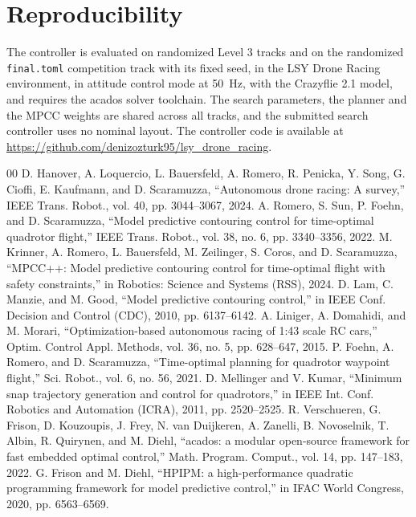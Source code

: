 \documentclass[conference]{IEEEtran}
\begin{document}
\appendices
\section{Reproducibility}
The controller is evaluated on randomized Level 3 tracks and on the randomized \texttt{final.toml} competition track with its fixed seed, in the LSY Drone Racing environment, in attitude control mode at 50~Hz, with the Crazyflie 2.1 model, and requires the acados solver toolchain. The search parameters, the planner and the MPCC weights are shared across all tracks, and the submitted search controller uses no nominal layout. The controller code is available at \url{https://github.com/denizozturk95/lsy_drone_racing}.

\begin{thebibliography}{00}
 D. Hanover, A. Loquercio, L. Bauersfeld, A. Romero, R. Penicka, Y. Song, G. Cioffi, E. Kaufmann, and D. Scaramuzza, ``Autonomous drone racing: A survey,'' IEEE Trans. Robot., vol. 40, pp. 3044--3067, 2024.
 A. Romero, S. Sun, P. Foehn, and D. Scaramuzza, ``Model predictive contouring control for time-optimal quadrotor flight,'' IEEE Trans. Robot., vol. 38, no. 6, pp. 3340--3356, 2022.
 M. Krinner, A. Romero, L. Bauersfeld, M. Zeilinger, S. Coros, and D. Scaramuzza, ``MPCC++: Model predictive contouring control for time-optimal flight with safety constraints,'' in Robotics: Science and Systems (RSS), 2024.
 D. Lam, C. Manzie, and M. Good, ``Model predictive contouring control,'' in IEEE Conf. Decision and Control (CDC), 2010, pp. 6137--6142.
 A. Liniger, A. Domahidi, and M. Morari, ``Optimization-based autonomous racing of 1:43 scale RC cars,'' Optim. Control Appl. Methods, vol. 36, no. 5, pp. 628--647, 2015.
 P. Foehn, A. Romero, and D. Scaramuzza, ``Time-optimal planning for quadrotor waypoint flight,'' Sci. Robot., vol. 6, no. 56, 2021.
 D. Mellinger and V. Kumar, ``Minimum snap trajectory generation and control for quadrotors,'' in IEEE Int. Conf. Robotics and Automation (ICRA), 2011, pp. 2520--2525.
 R. Verschueren, G. Frison, D. Kouzoupis, J. Frey, N. van Duijkeren, A. Zanelli, B. Novoselnik, T. Albin, R. Quirynen, and M. Diehl, ``acados: a modular open-source framework for fast embedded optimal control,'' Math. Program. Comput., vol. 14, pp. 147--183, 2022.
 G. Frison and M. Diehl, ``HPIPM: a high-performance quadratic programming framework for model predictive control,'' in IFAC World Congress, 2020, pp. 6563--6569.

\end{thebibliography}
\end{document}
